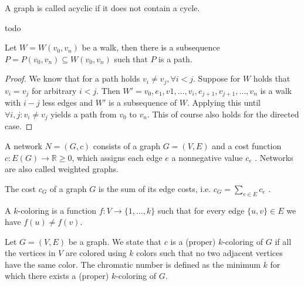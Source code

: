 \begin{definition}
A graph is called acyclic if it does not contain a cycle.
\end{definition}

\begin{definition}
todo
\end{definition}

\begin{theorem}
Let $W = W(v_0,v_n)$ be a walk, then there is a subsequence $P = P(v_0,v_n) \subseteq W(v_0,v_n)$ such that $P$ is a path.
\label{theo:pathinwalk}
\end{theorem}

\begin{proof}
We know that for a path holds $v_i \neq v_j, \forall i < j$. Suppose for $W$ holds that $v_i = v_j$ for arbitrary $i < j$. Then $W' = v_0,e_1,v1,\ldots,v_i,e_{j+1},v_{j+1},\ldots,v_n$ is a walk with $i-j$ less edges and $W'$ is a subsequence of $W$. Applying this until $\forall i, j : v_i \neq v_j$ yields a path from $v_0$ to $v_n$. This of course also holds for the directed case.
\end{proof}

\begin{definition}[Network]
A network $N = (G, c)$ consists of a graph $G = (V, E)$ and a cost function $c : E(G) \longrightarrow \mathbb{R} \geq 0$, which assigns each edge $e$ a nonnegative value $c_e$ . Networks are also called weighted graphs.
\end{definition}

\begin{definition}
The cost $c_G$ of a graph $G$ is the sum of its edge costs, i.e. $c_G = \sum_{e\in E}c_e$ .
\end{definition}


\begin{definition}[$k$-coloring]
A $k$-coloring is a function $f : V \rightarrow \{1,\ldots , k\}$ such that
for every edge $\{u, v\}\in E$ we have $f(u) \neq f(v)$.
\end{definition}

\begin{definition}
Let $G = (V, E)$ be a graph. We state that $c$ is a (proper) $k$-coloring of $G$ if all the vertices in $V$ are colored using $k$ colors such that no two adjacent vertices have the same color. The chromatic number is defined as the minimum $k$ for which there exists a (proper) $k$-coloring of $G$.
\end{definition}

